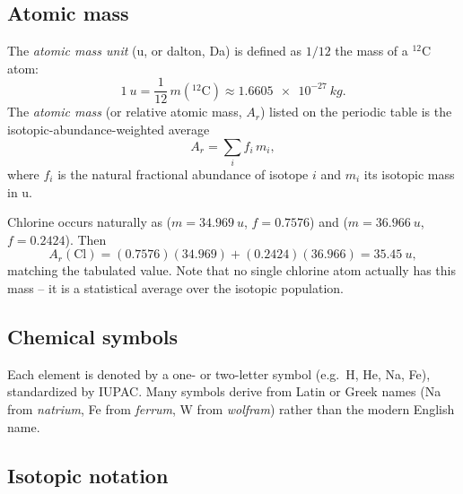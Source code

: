 \documentclass[11pt]{article}
\numberwithin{equation}{section}
\numberwithin{figure}{section}
\begin{document}
	\subsection{Atomic mass}

	\begin{concept}
		The \emph{atomic mass unit} (u, or dalton, Da) is defined as $1/12$ the mass of a $^{12}\mathrm{C}$ atom:
		\begin{equation}
			\SI{1}{u} = \frac{1}{12}\, m(^{12}\mathrm{C}) \approx \SI{1.6605e-27}{kg}.
		\end{equation}
		The \emph{atomic mass} (or relative atomic mass, $A_r$) listed on the periodic table is the isotopic-abundance-weighted average
		\begin{equation}
			A_r = \sum_i f_i\, m_i,
		\end{equation}
		where $f_i$ is the natural fractional abundance of isotope $i$ and $m_i$ its isotopic mass in u.
	\end{concept}
	
	\begin{workedexample}
		Chlorine occurs naturally as  ($m = \SI{34.969}{u}$, ${f = 0.7576}$) and  ($m = \SI{36.966}{u}$, ${f = 0.2424}$). Then
		\begin{equation}
			A_r(\mathrm{Cl}) = (0.7576)(34.969) + (0.2424)(36.966) = \SI{35.45}{u},
		\end{equation}
		matching the tabulated value. Note that no single chlorine atom actually has this mass -- it is a statistical average over the isotopic population.
	\end{workedexample}
	
	\subsection{Chemical symbols}

	\begin{concept}
		Each element is denoted by a one- or two-letter symbol (e.g.\ H, He, Na, Fe), standardized by IUPAC.
		Many symbols derive from Latin or Greek names (Na from \textit{natrium}, Fe from \textit{ferrum}, W from \textit{wolfram}) rather than the modern English name.
	\end{concept}
	
	\subsection{Isotopic notation}
\end{document}

